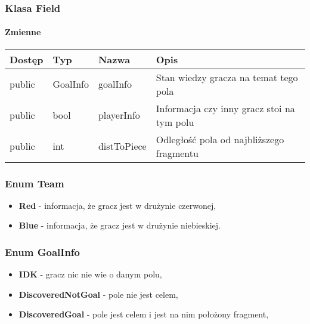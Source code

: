 \documentclass[../Dokumentacja.tex]{subfiles}
\begin{document}
\subsubsection{Klasa Field}
\paragraph{Zmienne}
\begin{center}
    \begin{tabular}{ | l | l | l | p{5cm} |}
    \hline
    Dostęp & Typ & Nazwa & Opis \\ \hline
    public & GoalInfo & goalInfo & Stan wiedzy gracza na temat tego pola \\ \hline
    public & bool & playerInfo & Informacja czy inny gracz stoi na tym polu \\ \hline
    public & int & distToPiece & Odległość pola od najbliższego fragmentu \\ \hline
    \end{tabular}
\end{center}
\subsubsection{Enum Team}
\begin{itemize}
    \item \textbf{Red} - informacja, że gracz jest w drużynie czerwonej,
    \item \textbf{Blue} - informacja, że gracz jest w drużynie niebieskiej.
\end{itemize}
\subsubsection{Enum GoalInfo}
\begin{itemize}
    \item \textbf{IDK} - gracz nic nie wie o danym polu,
    \item \textbf{DiscoveredNotGoal} - pole nie jest celem,
    \item \textbf{DiscoveredGoal} - pole jest celem i jest na nim położony fragment,
\end{itemize}
\end{document}
